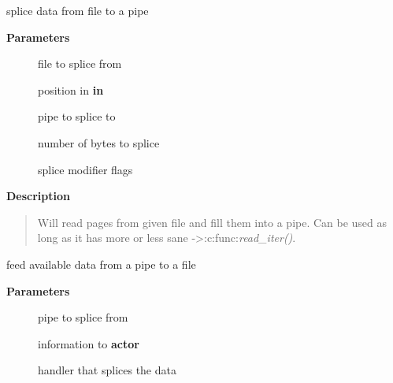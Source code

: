 \documentclass[a4paper,8pt,english]{sphinxmanual}
\begin{document}
\begin{fulllineitems}
\label{filesystems/index:c.generic_file_splice_read}
splice data from file to a pipe

\end{fulllineitems}


\textbf{Parameters}
\begin{description}
\item[{}] \leavevmode
file to splice from

\item[{}] \leavevmode
position in \textbf{in}

\item[{}] \leavevmode
pipe to splice to

\item[{}] \leavevmode
number of bytes to splice

\item[{}] \leavevmode
splice modifier flags

\end{description}

\textbf{Description}
\begin{quote}

Will read pages from given file and fill them into a pipe. Can be
used as long as it has more or less sane -\textgreater{}:c:func:\emph{read\_iter()}.
\end{quote}

\begin{fulllineitems}
\label{filesystems/index:c.splice_from_pipe_feed}
feed available data from a pipe to a file

\end{fulllineitems}


\textbf{Parameters}
\begin{description}
\item[{}] \leavevmode
pipe to splice from

\item[{}] \leavevmode
information to \textbf{actor}

\item[{}] \leavevmode
handler that splices the data

\end{description}
\end{document}
